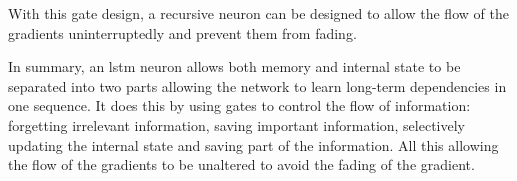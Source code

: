 With this gate design, a recursive neuron can be designed to allow the flow of the gradients uninterruptedly and prevent them from fading.
\newline

 
 
 In summary, an \acrshort{lstm} neuron allows both memory and internal state to be separated into two parts allowing the network to learn long-term dependencies in one sequence. It does this by using gates to control the flow of information: forgetting irrelevant information, saving important information, selectively updating the internal state and saving part of the information. All this allowing the flow of the gradients to be unaltered to avoid the fading of the gradient.